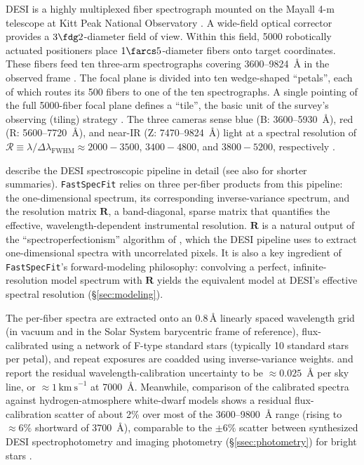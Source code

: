 \documentclass[modern,linenumbers]{aastex702}
\newcommand{\fastspecfit}{\texttt{FastSpecFit}}
\newcommand{\kms}{\ensuremath{\mathrm{km~s}^{-1}}}
\begin{document}
DESI is a highly multiplexed fiber spectrograph mounted on the Mayall
4-m telescope at Kitt Peak National Observatory
\citep{desi-collaboration16b, desi-collaboration22a}.  A wide-field
optical corrector \citep{miller24a} provides a $3\fdg2$-diameter field
of view. Within this field, 5000 robotically actuated positioners
  \citep{silber23a} place $1\farcs5$-diameter fibers
\citep{poppett24a} onto target coordinates. These fibers feed ten three-arm
spectrographs covering 3600--9824~\AA{} in the observed frame
\citep{desi-collaboration22a}. The focal plane is divided into ten
wedge-shaped ``petals'', each of which routes its 500 fibers to one of
the ten spectrographs. A single pointing of the full 5000-fiber focal
plane defines a ``tile'', the basic unit of the survey's observing
(tiling) strategy \citep{schlafly23a}. The three cameras sense blue
(B: 3600--5930~\AA), red (R: 5600--7720~\AA), and near-IR (Z:
7470--9824~\AA) light at a spectral resolution of
$\mathcal{R}\equiv\lambda/\Delta\lambda_\mathrm{FWHM} \approx
2000-3500$, $3400-4800$, and $3800-5200$, respectively
\citep{desi-collaboration22a}.

\citet{guy23a} describe the DESI spectroscopic pipeline in detail (see
also \citealt{desi-collaboration24d, desi-collaboration26a} for
shorter summaries). \fastspecfit{} relies on three per-fiber products
from this pipeline: the one-dimensional spectrum, its corresponding
inverse-variance spectrum, and the resolution matrix $\mathbf{R}$, a
band-diagonal, sparse matrix that quantifies the effective,
wavelength-dependent instrumental resolution. $\mathbf{R}$ is a
natural output of the ``spectroperfectionism''
algorithm of \citet{bolton10a}, which the DESI pipeline uses to
extract one-dimensional spectra with uncorrelated pixels. It is also a
key ingredient of \fastspecfit's forward-modeling philosophy:
convolving a perfect, infinite-resolution model spectrum with
$\mathbf{R}$ yields the equivalent model at DESI's effective spectral
resolution (\S\ref{sec:modeling}).

The per-fiber spectra are extracted onto an 0.8\,\AA{} linearly
spaced wavelength grid (in vacuum and in the Solar System barycentric
frame of reference), flux-calibrated using a network of F-type
standard stars (typically 10 standard stars per petal), and repeat
exposures are coadded using inverse-variance
weights. \citet{guy23a} and \citet{koposov26a} report the residual
wavelength-calibration uncertainty to be $\approx0.025$~\AA{} per sky
line, or $\approx1$\,\kms{} at 7000~\AA. Meanwhile, comparison of the
calibrated spectra against hydrogen-atmosphere white-dwarf models
shows a residual flux-calibration scatter of about 2\% over most of
the 3600--9800~\AA{} range (rising to $\approx6\%$ shortward of
3700~\AA), comparable to the $\pm6\%$ scatter between synthesized DESI
spectrophotometry and imaging photometry (\S\ref{ssec:photometry}) for
bright stars \citep{guy23a}.
\end{document}
